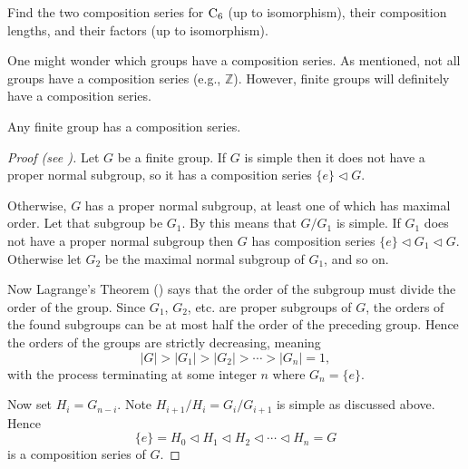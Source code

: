 \begin{exercise}
    Find the two composition series for $\mathrm{C}_{6}$ (up to isomorphism), their composition lengths, and their factors (up to isomorphism).
\end{exercise}

One might wonder which groups have a composition series. As mentioned, not all groups have a composition series (e.g., $\mathbb{Z}$). However, finite groups will definitely have a composition series.
\begin{theorem}\label{thrm-finite-group-has-composition-series}
    Any finite group has a composition series.
\end{theorem}
\begin{proof}[Proof (see \cite{hungerford_1980, proofwiki_finitegrouphascompositionseries})]
    Let $G$ be a finite group. If $G$ is simple then it does not have a proper normal subgroup, so it has a composition series $\{e\} \lhd G$.
    
    Otherwise, $G$ has a proper normal subgroup, at least one of which has maximal order. Let that subgroup be $G_1$. By  this means that $G/G_1$ is simple. If $G_1$ does not have a proper normal subgroup then $G$ has composition series $\{e\} \lhd G_1 \lhd G$. Otherwise let $G_2$ be the maximal normal subgroup of $G_1$, and so on. 
    
    Now Lagrange's Theorem () says that the order of the subgroup must divide the order of the group. Since $G_1$, $G_2$, etc. are proper subgroups of $G$, the orders of the found subgroups can be at most half the order of the preceding group. Hence the orders of the groups are strictly decreasing, meaning
    \[
        |G| > |G_1| > |G_2| > \cdots > |G_n| = 1,
    \]
    with the process terminating at some integer $n$ where $G_n = \{e\}$.
    
    \newpage

    Now set $H_i = G_{n-i}$. Note $H_{i+1}/H_i = G_i/G_{i+1}$ is simple as discussed above. Hence
    \[
        \{e\} = H_0 \lhd H_1 \lhd H_2 \lhd \cdots \lhd H_n = G    
    \]
    is a composition series of $G$.
\end{proof}

